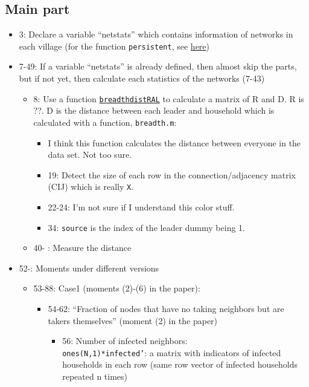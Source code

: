 \documentclass[10pt,letterpaper]{article}
\begin{document}
\begin{itemize}
\begin{itemize}
\subsection*{Main part}
\begin{itemize}
  \item 3: Declare a variable ``netstats'' which contains information of networks in each village (for the function \texttt{persistent}, see \href{https://www.mathworks.com/help/matlab/ref/persistent.html}{here})
  \item 7-49: If a variable ``netstats'' is already defined, then almost skip the parts, but if not yet, then calculate each statistics of the networks (7-43)
    \begin{itemize}
      \item 8: Use a function \hyperref[breadthdistRAL]{\texttt{breadthdistRAL}} to calculate a matrix of R and D. R is ??. D is the distance between each leader and household which is calculated with a function, \texttt{breadth.m}: 
      	\begin{itemize}
      		\item I think this function calculates the distance between everyone in the data set. Not too sure.
      		\item 19: Detect the size of each row in the connection/adjacency matrix (CIJ) which is really \texttt{X}. 
      		\item 22-24: I'm not sure if I understand this color stuff.
      		\item 34: \texttt{source} is the index of the leader dummy being 1. 
      	\end{itemize}
      \item 40- : Measure the distance 
    \end{itemize}
  \item 52-: Moments under different versions
    \begin{itemize}
      \item 53-88: Case1 (moments (2)-(6) in the paper):
        \begin{itemize}
          \item 54-62: ``Fraction of nodes that have no taking neighbors but are takers themselves'' (moment (2) in the paper)
            \begin{itemize}
              \item 56: Number of infected neighbors: \\
                \texttt{ones(N,1)*infected'}: a matrix with indicators of infected households in each row (same row vector of infected households repeated n times)\\

\end{itemize}
\end{itemize}
\end{itemize}
\end{itemize}
\end{itemize}
\end{itemize}
\end{document}
